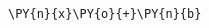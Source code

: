 {\par%
\vspace{-1\baselineskip}%
}%
\begin{notebookcell}[84]%
\begin{addmargin}[\cellleftmargin]{0em}%
{\smaller%
\par%
%
\vspace{-1\smallerfontscale}%
\begin{Verbatim}[commandchars=\\\{\}]
\PY{n}{x}\PY{o}{+}\PY{n}{b}
\end{Verbatim}
%
\par%
\vspace{-1\smallerfontscale}}%
\end{addmargin}
\end{notebookcell}

\par\vspace{1\smallerfontscale}%
    

